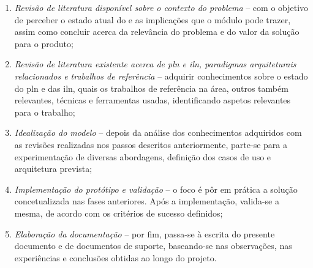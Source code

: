 \begin{enumerate}
    \item 
    {
        \textit{Revisão de literatura disponível sobre o contexto do problema} -- com o objetivo de perceber o estado atual do {\productname} e as implicações que o módulo pode trazer, assim como concluir acerca da relevância do problema e do valor da solução para o produto;
    }
    \item
    {
        \textit{Revisão de literatura existente acerca de \gls{pln} e \gls{iln}, paradigmas arquiteturais relacionados e trabalhos de referência} -- adquirir conhecimentos sobre o estado do \gls{pln} e das \gls{iln}, quais os trabalhos de referência na área, outros também relevantes, técnicas e ferramentas usadas, identificando aspetos relevantes para o trabalho;
    }
    \item
    {
        \textit{Idealização do modelo} -- depois da análise dos conhecimentos adquiridos com as revisões realizadas nos passos descritos anteriormente,
        parte-se para a experimentação de diversas abordagens, definição dos casos de uso e arquitetura prevista;
    }
    \item
    {
        \textit{Implementação do protótipo e validação} -- o foco é pôr em prática a solução concetualizada nas fases anteriores. Após a implementação, valida-se a mesma, de acordo com os critérios de sucesso definidos;
    }
    \item
    {
        \textit{Elaboração da documentação} --  por fim, passa-se à escrita do presente documento e de documentos de suporte, baseando-se nas observações, nas experiências e conclusões obtidas ao longo do projeto.
    }
\end{enumerate}
